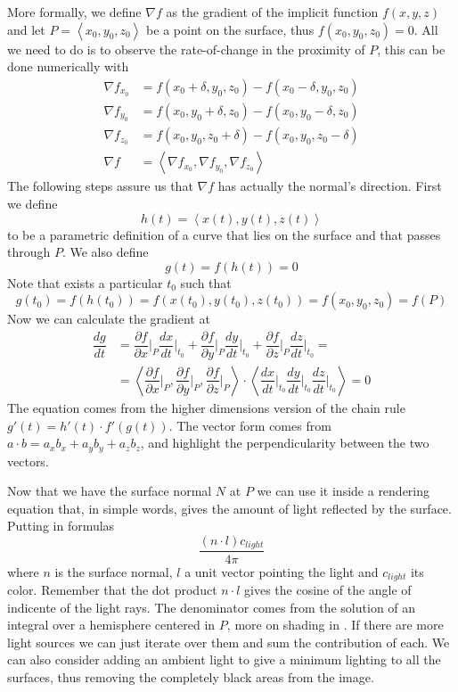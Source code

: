 More formally, we define $\nabla f$ as the gradient of the implicit function $f(x,y,z)$ and let $P = \left< x_0, y_0, z_0 \right>$ be a point on the surface, thus $f(x_0, y_0, z_0) = 0$.
All we need to do is to observe the rate-of-change in the proximity of $P$,
this can be done numerically with 
\begin{align*}
  \nabla f_{x_0} &= f(x_0+\delta, y_0       , z_0       ) - f(x_0-\delta, y_0       , z_0)\\
  \nabla f_{y_0} &= f(x_0       , y_0+\delta, z_0       ) - f(x_0       , y_0-\delta, z_0)\\
  \nabla f_{z_0} &= f(x_0       , y_0       , z_0+\delta) - f(x_0       , y_0       , z_0-\delta)\\
  \nabla f   &= \left< \nabla f_{x_0}, \nabla f_{y_0}, \nabla f_{z_0} \right>
\end{align*}
The following steps assure us that $\nabla f$ has actually the normal's direction.
First we define
$$h(t) = \left< x(t), y(t), z(t) \right>$$
to be a parametric definition of a curve that lies on the surface and that passes through $P$.
We also define 
$$g(t) = f(h(t)) = 0$$
Note that exists a particular $t_0$ such that
$$g(t_0) = f(h(t_0)) = f(x(t_0), y(t_0), z(t_0)) = f(x_0, y_0, z_0) = f(P)$$ %
Now we can calculate the gradient at 
\begin{align*}
  \dfrac{dg}{dt} &=
\dfrac {\partial f} {\partial x} \bigg\rvert_{P} \dfrac {d x} {d t} \bigg\rvert_{t_0} + \dfrac {\partial f} {\partial y} \bigg\rvert_{P}\dfrac {d y} {d t} \bigg\rvert_{t_0} + \dfrac {\partial f} {\partial z} \bigg\rvert_{P}\dfrac {d z} {d t} \bigg\rvert_{t_0}
=\\
                 &= \left< \dfrac {\partial f} {\partial x} \bigg\rvert_{P}, \dfrac {\partial f} {\partial y} \bigg\rvert_{P}, \dfrac {\partial f} {\partial z} \bigg\rvert_{P} \right> \cdot \left<  \dfrac {d x} {d t} \bigg\rvert_{t_0}  \dfrac {d y} {d t} \bigg\rvert_{t_0}  \dfrac {d z} {d t} \bigg\rvert_{t_0} \right> = 0 %
\end{align*}
The equation comes from the higher dimensions version of the chain rule $g'(t) = h'(t) \cdot f'(g(t))$.
The vector form comes from $a \cdot b = a_x b_x + a_y b_y + a_z b_z$, and highlight the perpendicularity between the two vectors.

Now that we have the surface normal $N$ at $P$ we can use it inside a rendering equation that, in simple words, gives the amount of light reflected by the surface.
Putting in formulas
$$
\dfrac{ (n \cdot l) c_{light} }
{ 4 \pi }
$$
where $n$ is the surface normal, $l$ a unit vector pointing the light and $c_{light}$ its color.
Remember that the dot product $n \cdot l$ gives the cosine of the angle of indicente of the light rays.
The denominator comes from the solution of an integral over a hemisphere centered in $P$, more on shading in \cite{real_time_rendering}.
If there are more light sources we can just iterate over them and sum the contribution of each.
We can also consider adding an ambient light to give a minimum lighting to all the surfaces, thus removing the completely black areas from the image.

